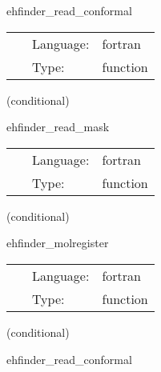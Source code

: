 \hspace{5mm} ehfinder\_read\_conformal 

\hspace{5mm}{\it read in conformal factor from file } 


\hspace{5mm}

 \begin{tabular*}{160mm}{cll} 
~ & Language:  & fortran \\ 
~ & Type:  & function \\ 
\end{tabular*} 


\vspace{5mm}

   (conditional) 

\hspace{5mm} ehfinder\_read\_mask 

\hspace{5mm}{\it read in excision mask from file } 


\hspace{5mm}

 \begin{tabular*}{160mm}{cll} 
~ & Language:  & fortran \\ 
~ & Type:  & function \\ 
\end{tabular*} 


\vspace{5mm}

   (conditional) 

\hspace{5mm} ehfinder\_molregister 

\hspace{5mm}{\it register evolution variables } 


\hspace{5mm}

 \begin{tabular*}{160mm}{cll} 
~ & Language:  & fortran \\ 
~ & Type:  & function \\ 
\end{tabular*} 


\vspace{5mm}

   (conditional) 

\hspace{5mm} ehfinder\_read\_conformal 


